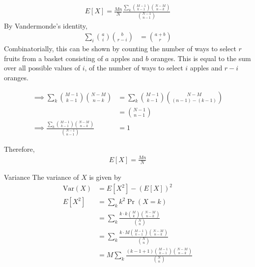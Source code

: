 \documentclass{beamer}
\providecommand{\pr}[1]{\ensuremath{\Pr\left(#1\right)}}
\providecommand{\brak}[1]{\ensuremath{\left(#1\right)}}
\begin{document}
	\begin{frame}
	\begin{align}
		E[X] = \frac{Mn}{N} \frac{\sum_k \binom{M-1}{k-1} \binom{N-M}{n-k}}{\binom{N-1}{n-1}}
	\end{align}
	By Vandermonde's identity,
	\begin{align}
		\sum_i \binom{a}{i}\binom{b}{r-i} &= \binom{a+b}{r}
	\end{align}
	Combinatorially, this can be shown by counting the number of ways to select $r$ fruits from a basket consisting of $a$ apples and $b$ oranges. This is equal to the sum over all possible values of $i$, of the number of ways to select $i$ apples and $r-i$ oranges.
	\end{frame}
	
	\begin{frame}
	\begin{align}
		\implies \sum_k \binom{M-1}{k-1} \binom{N-M}{n-k} &= \sum_k \binom{M-1}{k-1} \binom{N-M}{(n-1)-(k-1)} \\
		&= \binom{N-1}{n-1} \\
		\implies \frac{\sum_k \binom{M-1}{k-1} \binom{N-M}{n-k}}{\binom{N-1}{n-1}} &= 1
	\end{align}
	\begin{block}{}
	Therefore,
		\begin{align}
			E[X] = \frac{Mn}{N}
		\end{align}
	\end{block}
	\end{frame}
	
	\begin{frame}{Variance}
	The variance of $X$ is given by
	\begin{align}
		\mathrm{Var}(X) &= E[X^2] - \brak{E[X]}^2 \\
		E[X^2] &= \sum_k k^2 \pr{X=k} \\
		&= \sum_k \frac{k \cdot k \binom{M}{k} \binom{N-M}{n-k}}{\binom{N}{n}} \\
		&= \sum_k \frac{k \cdot M \binom{M-1}{k-1} \binom{N-M}{n-k}}{\binom{N}{n}} \\
		&= M \sum_k \frac{(k-1+1) \binom{M-1}{k-1} \binom{N-M}{n-k}}{\binom{N}{n}} \\
	\end{align}
	\end{frame}
	
\end{document}
